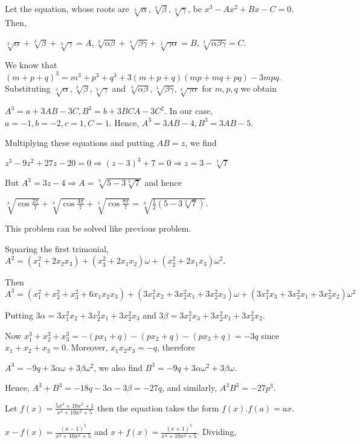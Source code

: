  Let the equation, whose roots are $\sqrt[3]{\alpha}, \sqrt[3]{\beta}, \sqrt[3]{\gamma}$, be $x^3 - Ax^2 +
  Bx - C = 0$. Then,

  $\sqrt[3]{\alpha} + \sqrt[3]{\beta} + \sqrt[3]{\gamma} = A, \sqrt[3]{\alpha\beta} + \sqrt[3]{\beta\gamma}
  + \sqrt[3]{\gamma\alpha} = B, \sqrt[3]{\alpha\beta\gamma} = C$.

  We know that $(m + p + q)^3 = m^3 + p^3 + q^3 + 3(m + p + q)(mp + mq + pq) - 3mpq$. Substituting
  $\sqrt[3]{\alpha}, \sqrt[3]{\beta}, \sqrt[3]{\gamma}$ and $\sqrt[3]{\alpha\beta}, \sqrt[3]{\beta\gamma},
  \sqrt[3]{\gamma\alpha}$ for $m, p, q$ we obtain

  $A^3 = a + 3AB - 3C, B^3 = b + 3BCA - 3C^2$. In our case, $a = -1, b = -2, c = 1, C = 1$. Hence, $A^3 = 3AB
  - 4, B^3 = 3AB - 5$.

  Multiplying these equations and putting $AB = z$, we find

  $z^3 - 9z^2 + 27z - 20 = 0 \Rightarrow (z - 3)^3 + 7 = 0 \Rightarrow z = 3 - \sqrt[3]{7}$

  But $A^3 = 3z - 4 \Rightarrow A = \sqrt[3]{5 - 3\sqrt[3]{7}}$ and hence

  $\sqrt[3]{\cos\frac{2\pi}{7}} + \sqrt[3]{\cos\frac{4\pi}{7}} + \sqrt[3]{\cos\frac{8\pi}{7}} =
  \sqrt[3]{\frac{1}{2}(5 - 3\sqrt[3]{7})}$.
\item This problem can be solved like previous problem.
\item Squaring the first trimonial, $A^2 = (x_1^2 + 2x_2x_3) + (x_3^2 + 2x_1x_2)\omega + (x_2^2 +
  2x_1x_3)\omega^2$.

  Then $A^3 = (x_1^2 + x_2^2 + x_3^2 + 6x_1x_2x_3) + (3x_1^2x_2 + 3x_2^2x_1 + 3x_2^2x_3)\omega + (3x_1^2x_3
  + 3x_2^2x_1 + 3x_3^2x_2)\omega^2$

  Putting $3\alpha = 3x_1^2x_2 + 3x_2^2x_1 + 3x_2^2x_3$ and $3\beta = 3x_1^2x_3 + 3x_2^2x_1 + 3x_3^2x_2$.

  Now $x_1^3 + x_2^3 + x_3^3 = -(px_1 + q) - (px_2 + q) - (px_3 + q) = -3q$ since $x_1 + x_2 + x_3 =
  0$. Moreover, $x_1x_2x_3 = -q$, therefore

  $A^3 = -9q + 3\alpha\omega + 3\beta\omega^2$, we also find $B^3 = -9q + 3\alpha\omega^2 + 3\beta\omega$.

  Hence, $A^3 + B^3 = -18q - 3\alpha - 3\beta = -27q$, and similarly, $A^3B^3 = -27p^3$.
\item Let $f(x) = \frac{5x^4 + 10x^2 + 1}{x^4 + 10x^2 + 5}$ then the equation takes the form $f(x).f(a) =
  ax$.

  $x - f(x) = \frac{(x - 1)^5}{x^4 + 10x^2 + 5}$ and $x + f(x) = \frac{(x + 1)^5}{x^4 + 10x^2 +
    5}$. Dividing,


